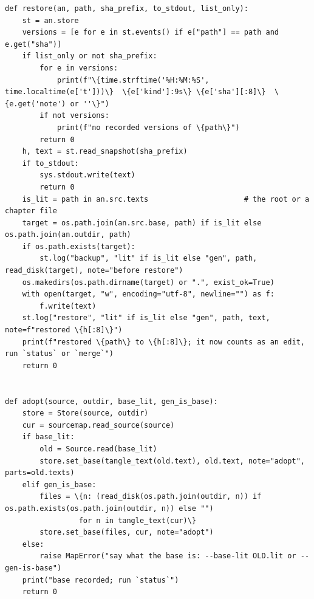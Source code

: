 \documentclass[10pt,a4paper]{article}
\begin{document}
\begin{Verbatim}
def restore(an, path, sha_prefix, to_stdout, list_only):
    st = an.store
    versions = [e for e in st.events() if e["path"] == path and e.get("sha")]
    if list_only or not sha_prefix:
        for e in versions:
            print(f"\{time.strftime('%H:%M:%S', time.localtime(e['t']))\}  \{e['kind']:9s\} \{e['sha'][:8]\}  \{e.get('note') or ''\}")
        if not versions:
            print(f"no recorded versions of \{path\}")
        return 0
    h, text = st.read_snapshot(sha_prefix)
    if to_stdout:
        sys.stdout.write(text)
        return 0
    is_lit = path in an.src.texts                      # the root or a chapter file
    target = os.path.join(an.src.base, path) if is_lit else os.path.join(an.outdir, path)
    if os.path.exists(target):
        st.log("backup", "lit" if is_lit else "gen", path, read_disk(target), note="before restore")
    os.makedirs(os.path.dirname(target) or ".", exist_ok=True)
    with open(target, "w", encoding="utf-8", newline="") as f:
        f.write(text)
    st.log("restore", "lit" if is_lit else "gen", path, text, note=f"restored \{h[:8]\}")
    print(f"restored \{path\} to \{h[:8]\}; it now counts as an edit, run `status` or `merge`")
    return 0


def adopt(source, outdir, base_lit, gen_is_base):
    store = Store(source, outdir)
    cur = sourcemap.read_source(source)
    if base_lit:
        old = Source.read(base_lit)
        store.set_base(tangle_text(old.text), old.text, note="adopt", parts=old.texts)
    elif gen_is_base:
        files = \{n: (read_disk(os.path.join(outdir, n)) if os.path.exists(os.path.join(outdir, n)) else "")
                 for n in tangle_text(cur)\}
        store.set_base(files, cur, note="adopt")
    else:
        raise MapError("say what the base is: --base-lit OLD.lit or --gen-is-base")
    print("base recorded; run `status`")
    return 0
\end{Verbatim}
\end{document}
